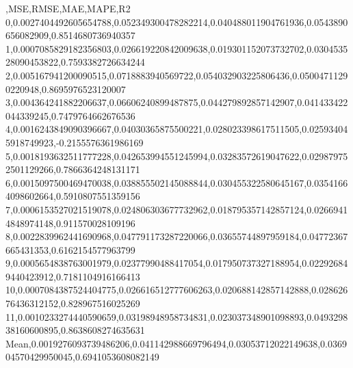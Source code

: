 ,MSE,RMSE,MAE,MAPE,R2
0,0.0027404492605654788,0.052349300478282214,0.040488011904761936,0.0543890656082909,0.8514680736940357
1,0.0007085829182356803,0.026619220842009638,0.019301152073732702,0.030453528090453822,0.7593382726634244
2,0.005167941200090515,0.0718883940569722,0.054032903225806436,0.05004711290220948,0.8695976523120007
3,0.004364241882206637,0.06606240899487875,0.044279892857142907,0.041433422044339245,0.7479764662676536
4,0.0016243849090396667,0.04030365875500221,0.028023398617511505,0.025934045918749923,-0.2155576361986169
5,0.0018193632511777228,0.042653994551245994,0.03283572619047622,0.029879752501129266,0.7866364248131171
6,0.0015097500469470038,0.038855502145088844,0.030455322580645167,0.03541664098602664,0.5910807551359156
7,0.0006153527021519078,0.024806303677732962,0.018795357142857124,0.02669414848974148,0.911570028109196
8,0.0022839962441690968,0.047791173287220066,0.03655744897959184,0.04772367665431353,0.6162154577963799
9,0.0005654838763001979,0.02377990488417054,0.017950737327188954,0.022926849440423912,0.7181104916166413
10,0.0007084387524404775,0.026616512777606263,0.020688142857142888,0.02862676436312152,0.828967516025269
11,0.0010233274440590659,0.03198948958734831,0.023037348901098893,0.049329838160600895,0.8638608274635631
Mean,0.0019276093739486206,0.041142988669796494,0.03053712022149638,0.036904570429950045,0.6941053608082149
